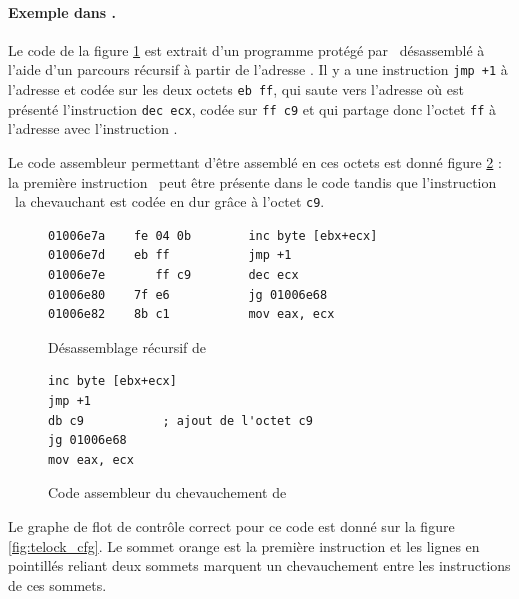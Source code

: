 \paragraph{Exemple dans \telock.}
Le code de la figure \ref{fig:telock_obf_disas} est extrait d'un programme protégé par \telock\ désassemblé à l'aide d'un parcours récursif à partir de l'adresse . Il y a une instruction \texttt{jmp +1} à l'adresse  et codée sur les deux octets \texttt{eb ff}, qui saute vers l'adresse  où est présenté l'instruction \texttt{dec ecx}, codée sur \texttt{ff c9} et qui partage donc l'octet \texttt{ff} à l'adresse  avec l'instruction \jmp.

Le code assembleur permettant d'être assemblé en ces octets est donné figure \ref{fig:telock_obf_asm} : la première instruction \jmp\ peut être présente dans le code tandis que l'instruction \dec\ la chevauchant est codée en dur grâce à l'octet \texttt{c9}.

\begin{figure}
\begin{lstlisting}[language={[x86masm]Assembler}, escapechar=~]
01006e7a    fe 04 0b        inc byte [ebx+ecx]
01006e7d    eb ff           jmp +1
01006e7e       ff c9        dec ecx
01006e80    7f e6           jg 01006e68
01006e82    8b c1           mov eax, ecx
\end{lstlisting}
\caption{Désassemblage récursif de \telock}
\label{fig:telock_obf_disas}
\end{figure}

\begin{figure}
\begin{lstlisting}[language={[x86masm]Assembler}, escapechar=~]
inc byte [ebx+ecx]
jmp +1
db c9 			; ajout de l'octet c9
jg 01006e68
mov eax, ecx
\end{lstlisting}
\caption{Code assembleur du chevauchement de \telock}
\label{fig:telock_obf_asm}
\end{figure}


Le graphe de flot de contrôle correct pour ce code est donné sur la figure \ref{fig:telock_cfg}. Le sommet orange est la première instruction et les lignes en pointillés reliant deux sommets marquent un chevauchement entre les instructions de ces sommets.

